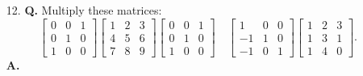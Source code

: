 \documentclass[main.tex]{subfiles}
\begin{document}
\begin{enumerate}
        \item [12.] \textbf{Q.} Multiply these matrices:
            $$
            \left[\begin{array}{lll}
            0 & 0 & 1 \\
            0 & 1 & 0 \\
            1 & 0 & 0
            \end{array}\right]\left[\begin{array}{lll}
            1 & 2 & 3 \\
            4 & 5 & 6 \\
            7 & 8 & 9
            \end{array}\right]\left[\begin{array}{lll}
            0 & 0 & 1 \\
            0 & 1 & 0 \\
            1 & 0 & 0
            \end{array}\right] \quad\left[\begin{array}{rrr}
            1 & 0 & 0 \\
            -1 & 1 & 0 \\
            -1 & 0 & 1
            \end{array}\right]\left[\begin{array}{lll}
            1 & 2 & 3 \\
            1 & 3 & 1 \\
            1 & 4 & 0
            \end{array}\right] \text {. }
            $$
            \textbf{A.}
            

\end{enumerate}
\end{document}
